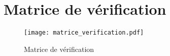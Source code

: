\chapter{Matrice de vérification}

\begin{figure}[htb]
\centering
\texttt{[image: matrice\_verification.pdf]}
\caption{Matrice de vérification}
\label{matrice}
\end{figure}